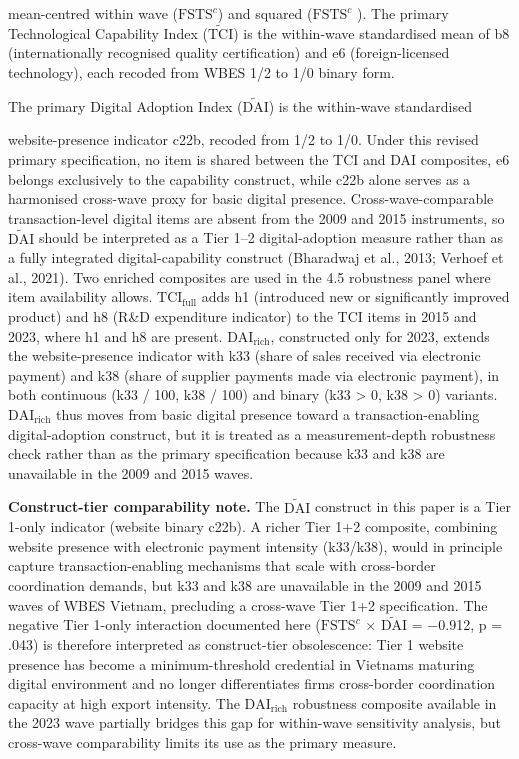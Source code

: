 \documentclass[12pt,a4paper]{article}
\begin{document}
mean-centred within wave (\(\mathrm{FSTS}^{c}\)) and squared
(\(\mathrm{FSTS}^{c}\) ). The primary Technological Capability Index
(\(\tilde{\mathrm{TCI}}\)) is the within-wave standardised mean of b8
(internationally recognised quality certification) and e6
(foreign-licensed technology), each recoded from WBES 1/2 to 1/0 binary
form.

The primary Digital Adoption Index (\(\tilde{\mathrm{DAI}}\)) is the
within-wave standardised

website-presence indicator c22b, recoded from 1/2 to 1/0. Under this
revised primary specification, no item is shared between the TCI and DAI
composites, e6 belongs exclusively to the capability construct, while
c22b alone serves as a harmonised cross-wave proxy for basic digital
presence. Cross-wave-comparable transaction-level digital items are
absent from the 2009 and 2015 instruments, so \(\tilde{\mathrm{DAI}}\)
should be interpreted as a Tier 1--2 digital-adoption measure rather
than as a fully integrated digital-capability construct (Bharadwaj et
al., 2013; Verhoef et al., 2021). Two enriched composites are used in
the 4.5 robustness panel where item availability allows.
\(\mathrm{TCI}_{\text{full}}\) adds h1 (introduced new or significantly
improved product) and h8 (R\&D expenditure indicator) to the TCI items
in 2015 and 2023, where h1 and h8 are present.
\(\mathrm{DAI}_{\text{rich}}\), constructed only for 2023, extends the
website-presence indicator with k33 (share of sales received via
electronic payment) and k38 (share of supplier payments made via
electronic payment), in both continuous (k33 / 100, k38 / 100) and
binary (k33 \textgreater{} 0, k38 \textgreater{} 0) variants.
\(\mathrm{DAI}_{\text{rich}}\) thus moves from basic digital presence
toward a transaction-enabling digital-adoption construct, but it is
treated as a measurement-depth robustness check rather than as the
primary specification because k33 and k38 are unavailable in the 2009
and 2015 waves.

\textbf{Construct-tier comparability note.} The \(\tilde{\mathrm{DAI}}\)
construct in this paper is a Tier 1-only indicator (website binary
c22b). A richer Tier 1+2 composite, combining website presence with
electronic payment intensity (k33/k38), would in principle capture
transaction-enabling mechanisms that scale with cross-border
coordination demands, but k33 and k38 are unavailable in the 2009 and
2015 waves of WBES Vietnam, precluding a cross-wave Tier 1+2
specification. The negative Tier 1-only interaction documented here
(\(\mathrm{FSTS}^{c}\) × \(\tilde{\mathrm{DAI}}\) = −0.912, p = .043) is
therefore interpreted as construct-tier obsolescence: Tier 1 website
presence has become a minimum-threshold credential in
Vietnam\textquotesingle s maturing digital environment and no longer
differentiates firms\textquotesingle{} cross-border coordination
capacity at high export intensity. The \(\mathrm{DAI}_{\text{rich}}\)
robustness composite available in the 2023 wave partially bridges this
gap for within-wave sensitivity analysis, but cross-wave comparability
limits its use as the primary measure.
\end{document}
